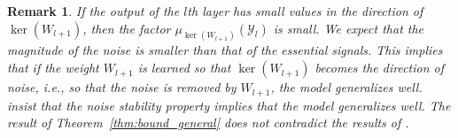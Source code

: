 \documentclass[twoside]{article}
\newtheorem{remark}[proposition]{Remark}
\def\mcl#1{\mathcal{#1}}
\def\opn{\operatorname}
\begin{document}
\begin{remark}
If the output of the $l$th layer has small values in the direction of $\opn{ker}(W_{l+1})$, then the factor $\mu_{\opn{ker}(W_{l+1})}(\mcl{Y}_l)$ is small. 
We expect that the magnitude of the noise is smaller than that of the essential signals.
This implies that if the weight $W_{l+1}$ is learned so that $\opn{ker}(W_{l+1})$ becomes the direction of noise, i.e., so that the noise is removed by $W_{l+1}$, the model generalizes well.
\citet{arora18} insist that the noise stability property implies that the model generalizes well.
The result of Theorem~\ref{thm:bound_general} does not contradict the results of \citet{arora18}.
\end{remark}
\end{document}
